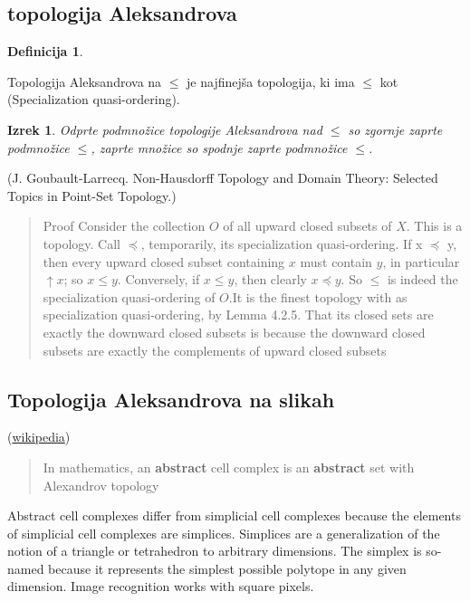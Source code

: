 \documentclass[mat1, tisk]{fmfdelo}
\newtheorem{definition}{Definicija}[subsection]
\newtheorem{theorem}{Izrek}[subsection]
\begin{document}
\subsection{topologija Aleksandrova}
\begin{definition}
  
\end{definition}
Topologija Aleksandrova na $\leq$ je najfinejša topologija,
ki ima $\leq$ kot (Specialization quasi-ordering).
\begin{theorem}
  Odprte podmnožice topologije Aleksandrova nad $\leq$ so zgornje zaprte podmnožice $\leq$, zaprte množice so spodnje zaprte podmnožice $\leq$.
\end{theorem}
(J. Goubault-Larrecq. Non-Hausdorff Topology and Domain Theory: Selected Topics in Point-Set Topology.)
\begin{quote}
  Proof Consider the collection $O$ of all upward closed subsets of $X$. This is a
  topology. Call $\preceq$, temporarily, its specialization quasi-ordering. If x $\preceq$ y, then
  every upward closed subset containing $x$ must contain $y$, in particular $\uparrow x$; so
  $x \leq y$. Conversely, if $x \leq y$, then clearly $x \preceq y$.
  So $\leq$ is indeed the specialization quasi-ordering of $O$.It is the finest topology with  as specialization
  quasi-ordering, by Lemma 4.2.5. That its closed sets are exactly the downward closed subsets
  is because the downward closed subsets are exactly the complements of upward closed subsets
\end{quote}
\subsection{Topologija Aleksandrova na slikah}
(\href{https://en.wikipedia.org/wiki/Abstract_cell_complex}{wikipedia})
\begin{quote}
  In mathematics, an \textbf{abstract} cell complex is an \textbf{abstract} set with Alexandrov topology
\end{quote}
Abstract cell complexes differ from simplicial cell complexes because the
elements of simplicial cell complexes are simplices. Simplices are
a generalization of the notion of a triangle or tetrahedron to arbitrary dimensions. 
The simplex is so-named because it represents the simplest possible polytope in any given dimension.
Image recognition works with square pixels.
\end{document}

